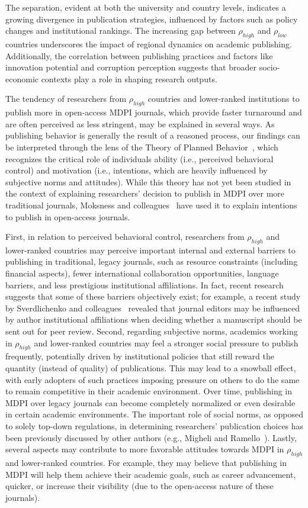 \documentclass[amsfonts, amssymb, prl, superscriptaddress, notitlepage, twocolumn, nofootinbib]{revtex4-2}
\begin{document}
The separation, evident at both the university and country levels, indicates a growing divergence in publication strategies, influenced by factors such as policy changes and institutional rankings. The increasing gap between $\rho_{high}$ and $\rho_{low}$ countries underscores the impact of regional dynamics on academic publishing. Additionally, the correlation between publishing practices and factors like innovation potential and corruption perception suggests that broader socio-economic contexts play a role in shaping research outputs. 

The tendency of researchers from $\rho_{high}$ countries and lower-ranked institutions to publish more in open-access MDPI journals, which provide faster turnaround and are often perceived as less stringent, may be explained in several ways. As publishing behavior is generally the result of a reasoned process, our findings can be interpreted through the lens of the Theory of Planned Behavior~\cite{ajzen1991}, which recognizes the critical role of individuals ability (i.e., perceived behavioral control) and motivation (i.e., intentions, which are heavily influenced by subjective norms and attitudes). While this theory has not yet been studied in the context of explaining researchers’ decision to publish in MDPI over more traditional journals, Moksness and colleagues~\cite{moksness2020} have used it to explain intentions to publish in open-access journals.

First, in relation to perceived behavioral control, researchers from $\rho_{high}$ and lower-ranked countries may perceive important internal and external barriers to publishing in traditional, legacy journals, such as resource constraints (including financial aspects), fewer international collaboration opportunities, language barriers, and less prestigious institutional affiliations. In fact, recent research suggests that some of these barriers objectively exist; for example, a recent study by Sverdlichenko and colleagues~\cite{sverdlichenko2022} revealed that journal editors may be influenced by author institutional affiliations when deciding whether a manuscript should be sent out for peer review. Second, regarding subjective norms, academics working in $\rho_{high}$ and lower-ranked countries may feel a stronger social pressure to publish frequently, potentially driven by institutional policies that still reward the quantity (instead of quality) of publications. This may lead to a snowball effect, with early adopters of such practices imposing pressure on others to do the same to remain competitive in their academic environment. Over time, publishing in MDPI over legacy journals can become completely normalized or even desirable in certain academic environments. The important role of social norms, as opposed to solely top-down regulations, in determining researchers' publication choices has been previously discussed by other authors (e.g., Migheli and Ramello~\cite{migheli2013}). Lastly, several aspects may contribute to more favorable attitudes towards MDPI in $\rho_{high}$ and lower-ranked countries. For example, they may believe that publishing in MDPI will help them achieve their academic goals, such as career advancement, quicker, or increase their visibility (due to the open-access nature of these journals).
\end{document}
